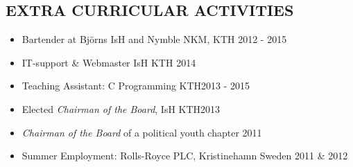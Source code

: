 \documentclass[margin]{res}
\begin{document}
\begin{resume}
\section{EXTRA CURRICULAR ACTIVITIES }
\begin{itemize}  \itemsep -3pt
            \item Bartender at Björns IsH and Nymble NKM, KTH \hfill 2012 - 2015 
            \item IT-support \& Webmaster IsH  KTH \hfill 2014 
            \item Teaching Assistant: C Programming KTH\hfill 2013 - 2015
            \item Elected {\it Chairman of the Board},  IsH KTH\hfill 2013 
            \item {\it Chairman of the Board} of a  political youth chapter \hfill 2011
            \item Summer Employment: Rolls-Royce PLC, Kristinehamn Sweden \hfill 2011 \& 2012
\end{itemize}

\end{resume}
\end{document}
